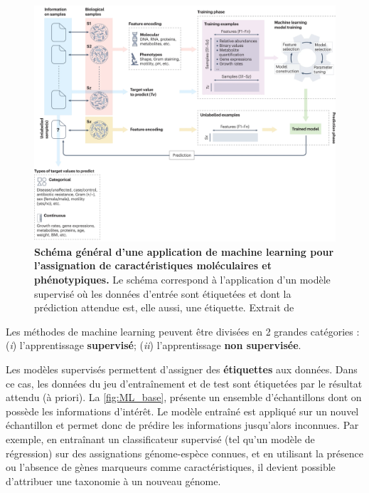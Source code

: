 \begin{figure}[htbp]
    \centering
    \includegraphics[width=\linewidth]{images/ML.png}
    \caption[Schéma général d'une application de machine learning]{\textbf{Schéma général d'une application de machine learning pour l'assignation de caractéristiques moléculaires et phénotypiques.} Le schéma correspond à l'application d'un modèle supervisé où les données d'entrée sont étiquetées et dont la prédiction attendue est, elle aussi, une étiquette. Extrait de \cite{asnicar_machine_2024}}
    \label{fig:ML_base}
\end{figure}

\newpage

Les méthodes de machine learning peuvent être divisées en 2 grandes catégories : (\textit{i}) l'apprentissage \textbf{supervisé}; (\textit{ii}) l'apprentissage \textbf{non supervisée}. 

Les modèles supervisés permettent d'assigner des \textbf{étiquettes} aux données. Dans ce cas, les données du jeu d’entraînement et de test sont étiquetées par le résultat attendu (à priori). La \autoref{fig:ML_base}, présente un ensemble d'échantillons dont on possède les informations d'intérêt. Le modèle entraîné est appliqué sur un nouvel échantillon et permet donc de prédire les informations jusqu'alors inconnues. Par exemple, en entraînant un classificateur supervisé (tel qu’un modèle de régression) sur des assignations génome-espèce connues, et en utilisant la présence ou l’absence de gènes marqueurs comme caractéristiques, il devient possible d’attribuer une taxonomie à un nouveau génome.

